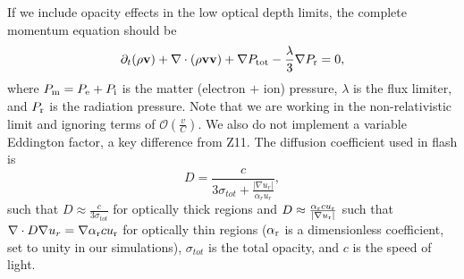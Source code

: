 \documentclass[preprint,11pt]{aastex}
\newcommand{\beq}{\begin{equation}}
\newcommand{\eeq}{\end{equation}}
\begin{document}
If we include opacity effects in the low optical depth limits, the complete momentum equation should be
{\color{blue}
\beq
\label{eq:newmom}
\partial_t (\rho\mathbf{v}) + \nabla \cdot (\rho\mathbf{v}\mathbf{v}) + \nabla P_{\rm tot} - \frac{\lambda}{3} \nabla P_{\rm r}= 0,
\eeq
}
where $P_{\rm m} = P_{\rm e} + P_{\rm i}$ is the matter (electron $+$ ion) pressure, $\lambda$ is the flux limiter, and $P_{\rm r}$ is the radiation pressure.  Note that we are working in the non-relativistic limit and ignoring terms of $\mathcal{O}(\frac{v}{C})$.  We also do not implement a variable Eddington factor, a key difference from Z11.  The diffusion coefficient used in flash is
\beq
D = \frac{c}{3\sigma_{tot} + \frac{|\nabla u_{r}|}{\alpha_r u_{r}}},
\eeq
such that $D \approx \frac{c}{3\sigma_{tot}}$ for optically thick regions and $D \approx \frac{\alpha_{\rm r} c u_{\rm r}}{|\nabla u_{\rm r} |}$  such that $\nabla\cdot D \nabla u_{r} = \nabla \alpha_{\rm r} c u_{\rm r}$ for optically thin regions ($\alpha_{\rm r}$ is a dimensionless coefficient, set to unity in our simulations), $\sigma_{tot}$ is the total opacity, and $c$ is the speed of light.
\end{document}
